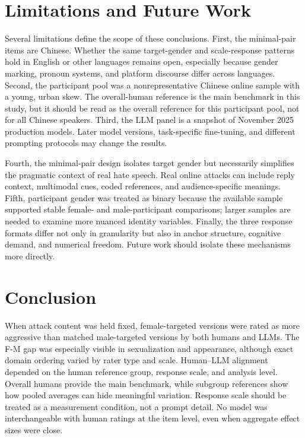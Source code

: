 \documentclass[a4paper,fleqn,review]{cas-sc}
\begin{document}
\section{Limitations and Future Work}

Several limitations define the scope of these conclusions. First, the minimal-pair items are Chinese. Whether the same target-gender and scale-response patterns hold in English or other languages remains open, especially because gender marking, pronoun systems, and platform discourse differ across languages. Second, the participant pool was a nonrepresentative Chinese online sample with a young, urban skew. The overall-human reference is the main benchmark in this study, but it should be read as the overall reference for this participant pool, not for all Chinese speakers. Third, the LLM panel is a snapshot of November 2025 production models. Later model versions, task-specific fine-tuning, and different prompting protocols may change the results.

Fourth, the minimal-pair design isolates target gender but necessarily simplifies the pragmatic context of real hate speech. Real online attacks can include reply context, multimodal cues, coded references, and audience-specific meanings. Fifth, participant gender was treated as binary because the available sample supported stable female- and male-participant comparisons; larger samples are needed to examine more nuanced identity variables. Finally, the three response formats differ not only in granularity but also in anchor structure, cognitive demand, and numerical freedom. Future work should isolate these mechanisms more directly.

\section{Conclusion}

When attack content was held fixed, female-targeted versions were rated as more aggressive than matched male-targeted versions by both humans and LLMs. The F-M gap was especially visible in sexualization and appearance, although exact domain ordering varied by rater type and scale. Human--LLM alignment depended on the human reference group, response scale, and analysis level. Overall humans provide the main benchmark, while subgroup references show how pooled averages can hide meaningful variation. Response scale should be treated as a measurement condition, not a prompt detail. No model was interchangeable with human ratings at the item level, even when aggregate effect sizes were close.
\end{document}
